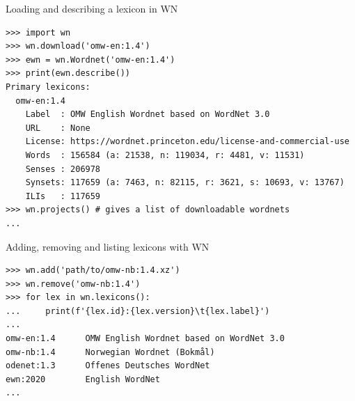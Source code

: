 \documentclass[aspectratio=169]{beamer}
\begin{document}
\begin{frame}[fragile]{Loading and describing a lexicon in WN}
\begin{verbatim}
>>> import wn
>>> wn.download('omw-en:1.4')
>>> ewn = wn.Wordnet('omw-en:1.4')
>>> print(ewn.describe())
Primary lexicons:
  omw-en:1.4
    Label  : OMW English Wordnet based on WordNet 3.0
    URL    : None
    License: https://wordnet.princeton.edu/license-and-commercial-use
    Words  : 156584 (a: 21538, n: 119034, r: 4481, v: 11531)
    Senses : 206978
    Synsets: 117659 (a: 7463, n: 82115, r: 3621, s: 10693, v: 13767)
    ILIs   : 117659
>>> wn.projects() # gives a list of downloadable wordnets
... 
\end{verbatim}
\end{frame}


\begin{frame}[fragile]{Adding, removing and listing lexicons with WN}
\begin{verbatim}
>>> wn.add('path/to/omw-nb:1.4.xz')
>>> wn.remove('omw-nb:1.4')
>>> for lex in wn.lexicons():
...     print(f'{lex.id}:{lex.version}\t{lex.label}')
...
omw-en:1.4      OMW English Wordnet based on WordNet 3.0
omw-nb:1.4      Norwegian Wordnet (Bokmål)
odenet:1.3      Offenes Deutsches WordNet
ewn:2020        English WordNet
...
\end{verbatim}
\end{frame}
\end{document}
